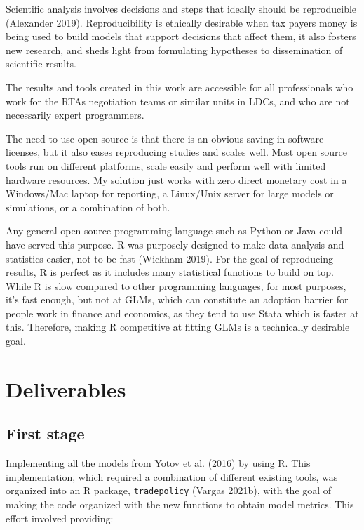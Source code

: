 \documentclass[12pt,reqno,oneside,pdftex]{formato-puc/puctesis} %
\begin{document}
Scientific analysis involves decisions and steps that ideally should be
reproducible (Alexander 2019). Reproducibility is ethically desirable
when tax payers money is being used to build models that support
decisions that affect them, it also fosters new research, and sheds
light from formulating hypotheses to dissemination of scientific
results.

The results and tools created in this work are accessible for all
professionals who work for the RTAs negotiation teams or similar units
in LDCs, and who are not necessarily expert programmers.

The need to use open source is that there is an obvious saving in
software licenses, but it also eases reproducing studies and scales
well. Most open source tools run on different platforms, scale easily
and perform well with limited hardware resources. My solution just works
with zero direct monetary cost in a Windows/Mac laptop for reporting, a
Linux/Unix server for large models or simulations, or a combination of
both.

Any general open source programming language such as Python or Java
could have served this purpose. R was purposely designed to make data
analysis and statistics easier, not to be fast (Wickham 2019). For the
goal of reproducing results, R is perfect as it includes many
statistical functions to build on top. While R is slow compared to other
programming languages, for most purposes, it's fast enough, but not at
GLMs, which can constitute an adoption barrier for people work in
finance and economics, as they tend to use Stata which is faster at
this. Therefore, making R competitive at fitting GLMs is a technically
desirable goal.

\hypertarget{deliverables}{%
\section{Deliverables}\label{deliverables}}

\hypertarget{first-stage}{%
\subsection{First stage}\label{first-stage}}

Implementing all the models from Yotov et al. (2016) by using R. This
implementation, which required a combination of different existing
tools, was organized into an R package, \texttt{tradepolicy} (Vargas
2021b), with the goal of making the code organized with the new
functions to obtain model metrics. This effort involved providing:
\end{document}
